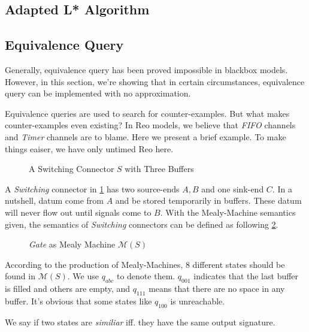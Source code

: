 \documentclass[conference, a4paper]{IEEEtran}
\begin{document}
\subsection{Adapted L* Algorithm}
\subsection{Equivalence Query}
Generally, equivalence query has been proved impossible in blackbox
models\cite{DBLP:journals/iandc/Angluin87}. However, in this
section, we're showing that in certain circumstances, equivalence query can be implemented with
no approximation.

Equivalence queries are used to search for counter-examples. But what makes counter-examples even
existing? In Reo models, we believe that \emph{FIFO} channels and \emph{Timer} channels are to
blame. Here we present a brief example. To make things eaiser, we have only untimed Reo here.

\begin{figure}[h]
  \begin{center}
    
  \end{center}
  \caption{A Switching Connector $S$ with Three Buffers}
  \label{fig:buf3}
\end{figure}

A \emph{Switching} connector in \figurename \ref{fig:buf3} has two source-ends $A,B$ and one
sink-end $C$. In a nutshell, datum come from $A$ and be stored temporarily in buffers. These datum
will never flow out until signals come to $B$. With the Mealy-Machine semantics given, the semantics
of \emph{Switching} connectors can be defined as following \figurename \ref{fig:buf3semantics}.

\begin{figure}[h]
  \begin{center}
    
  \end{center}
  \caption{\emph{Gate} as Mealy Machine $\mathcal{M}(S)$}
  \label{fig:buf3semantics}
\end{figure}

According to the production of Mealy-Machines, 8 different states should be found in
$\mathcal{M}(S)$. We use $q_{abc}$ to denote them. $q_{001}$ indicates that the last buffer is
filled and others are empty, and $q_{111}$ means that there are no space in any buffer. It's
obvious that some states like $q_{100}$ is unreachable.

We say if two states are \emph{similiar} iff. they have the same output signature.
\end{document}

